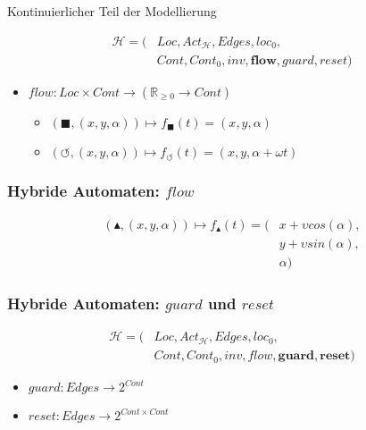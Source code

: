 \documentclass[ngerman]{beamer}
\begin{document}
\begin{section}{Kontinuierlicher Teil der Modellierung}
\begin{frame}
    \begin{align*}
        \mathcal{H} = ( & \mathit{Loc}, \mathit{Act}_{\mathcal{H}}, \mathit{Edges}, \mathit{loc}_0, \\
                        & \mathit{Cont}, \mathit{Cont}_0, \mathit{inv}, \mathbf{flow}, \mathit{guard}, \mathit{reset} )
    \end{align*}

    \begin{itemize}
        \item $\mathit{flow}: \mathit{Loc} \times \mathit{Cont} \rightarrow (\mathbb{R}_{\ge 0} \rightarrow \mathit{Cont}) $
            \begin{itemize}
                \item $(\blacksquare, (x, y, \alpha)) \mapsto f_\blacksquare(t) = (x, y, \alpha)$
                \item $(\circlearrowleft, (x, y, \alpha)) \mapsto f_\circlearrowleft(t) = (x, y, \alpha + \omega t)$
            \end{itemize}
    \end{itemize}
\end{frame}

\begin{frame}
    \frametitle{Hybride Automaten: $\mathit{flow}$}

    \begin{figure}
        \centering
        \def\svgwidth{0.6\columnwidth}
        
    \end{figure}

    \begin{align*}
        (\blacktriangle, (x, y, \alpha)) \mapsto f_\blacktriangle(t) = ( & x + \upsilon cos(\alpha), \\
                                                                           & y + \upsilon sin(\alpha), \\
                                                                           & \alpha )
    \end{align*}
\end{frame}

\begin{frame}
    \frametitle{Hybride Automaten: $\mathit{guard}$ und $\mathit{reset}$}

    \begin{align*}
        \mathcal{H} = ( & \mathit{Loc}, \mathit{Act}_{\mathcal{H}}, \mathit{Edges}, \mathit{loc}_0, \\
                        & \mathit{Cont}, \mathit{Cont}_0, \mathit{inv}, \mathit{flow}, \mathbf{guard}, \mathbf{reset} )
    \end{align*}

    \begin{itemize}
        \item $\mathit{guard}: \mathit{Edges} \rightarrow 2^{\mathit{Cont}}$
        \item $\mathit{reset}: \mathit{Edges} \rightarrow 2^{\mathit{Cont} \times \mathit{Cont}}$
    \end{itemize}
\end{frame}

\end{section}
\end{document}
